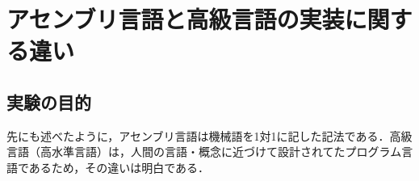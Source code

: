 \section{アセンブリ言語と高級言語の実装に関する違い}
\subsection{実験の目的}
先にも述べたように，アセンブリ言語は機械語を1対1に記した記法である．高級言語（高水準言語）は，人間の言語・概念に近づけて設計されてたプログラム言語であるため，その違いは明白である．\par